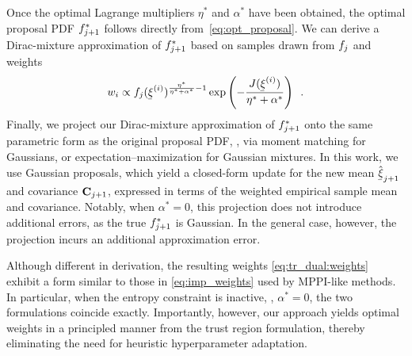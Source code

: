 

Once the optimal Lagrange multipliers $\eta^{\ast}$ and $\alpha^{\ast}$ have been obtained, the optimal proposal \ac{PDF} $f_{j+1}^{\ast}$ follows directly from~\cref{eq:opt_proposal}.
We can derive a Dirac-mixture approximation of $f_{j+1}^{\ast}$ based on samples drawn from $f_j$ and weights
\begin{align}
    \label{eq:tr_dual:weights}
    w_i \propto \pdf_j(\vVarCem^{(i)})^{\frac{\eta^{\ast}}{\eta^{\ast}+\alpha^{\ast}}-1}\exp\left(-\frac{J(\vVarCem^{(i)})}{\eta^{\ast}+\alpha^{\ast}}\right) \enspace.
\end{align}
Finally, we project our Dirac-mixture approximation of $f_{j+1}^{\ast}$ onto the same parametric form as the original proposal \ac{PDF}, \eg, via moment matching for Gaussians, or expectation--maximization for Gaussian mixtures.
In this work, we use Gaussian proposals, which yield a closed-form update for the new mean $\evVarCem_{j+1}$ and covariance ${{\mathbf{C}}}_{j+1}$, expressed in terms of the weighted empirical sample mean and covariance.
Notably, when $\alpha^{\ast} = 0$, this projection does not introduce additional errors, as the true $f_{j+1}^{\ast}$ is Gaussian. 
In the general case, however, the projection incurs an additional approximation error.

Although different in derivation, the resulting weights \cref{eq:tr_dual:weights} exhibit a form similar to those in \cref{eq:imp_weights} used by \ac{MPPI}-like methods.
In particular, when the entropy constraint is inactive, \ie, $\alpha^{\ast}=0$, the two formulations coincide exactly.
Importantly, however, our approach yields optimal weights in a principled manner from the trust region formulation, thereby eliminating the need for heuristic hyperparameter adaptation.